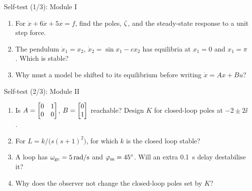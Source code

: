 \documentclass[10pt]{beamer-control}
\begin{document}
\begin{frame}{Self-test (1/3): Module I}
  \footnotesize
  \begin{enumerate}
    \item For $\ddot x + 6\dot x + 5x = f$, find the poles, $\zeta$, and the steady-state response to a unit step force.
    \item The pendulum $\dot x_1 = x_2$, $\dot x_2 = \sin x_1 - cx_2$ has equilibria at $x_1 = 0$ and $x_1 = \pi$. Which is stable?
    \item Why must a model be shifted to its equilibrium before writing $\dot x = Ax+Bu$?
  \end{enumerate}
\end{frame}

\begin{frame}{Self-test (2/3): Module II}
  \footnotesize
  \begin{enumerate}
    \item Is $A = \begin{bmatrix}0&1\\0&0\end{bmatrix}$, $B=\begin{bmatrix}0\\1\end{bmatrix}$ reachable? Design $K$ for closed-loop poles at $-2\pm 2\ii$.
    \item For $L = k/\bigl(s(s+1)^2\bigr)$, for which $k$ is the closed loop stable?
    \item A loop has $\omega_{\text{gc}} = \SI{5}{rad/s}$ and $\varphi_{\text{m}} = \ang{45}$. Will an extra \SI{0.1}{s} delay destabilise it?
    \item Why does the observer not change the closed-loop poles set by $K$?
  \end{enumerate}
\end{frame}
\end{document}
